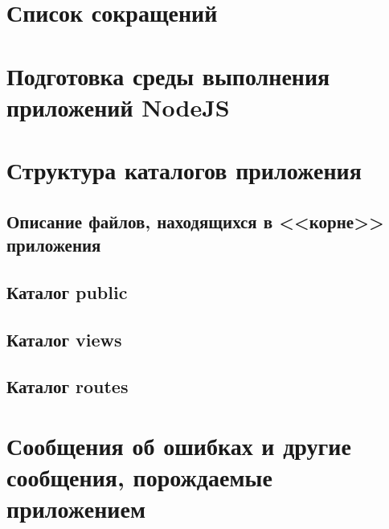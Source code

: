 \documentclass[russian]{eskdtext}
\begin{document}
\maketitle


\tableofcontents
\newpage

\section*{Список сокращений}

\newpage

\section{Подготовка среды выполнения приложений NodeJS}
	
\section{Структура каталогов приложения}
	\subsection{Описание файлов, находящихся в <<корне>> приложения}
	\subsection{Каталог public}
	\subsection{Каталог views}
	\subsection{Каталог routes}
	\newpage

\section{Сообщения об ошибках и другие сообщения, порождаемые приложением}
	
\end{document}
